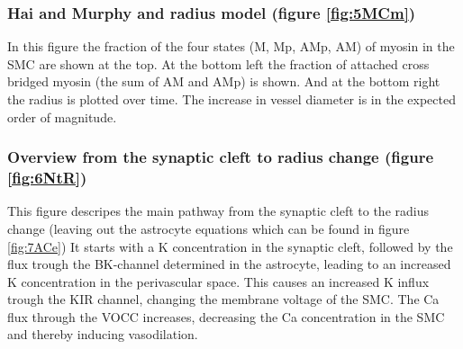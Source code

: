 	\subsubsection*{Hai and Murphy and radius model (figure \ref{fig:5MCm})}
	In this figure the fraction of the four states (M, Mp, AMp, AM) of myosin in the SMC are shown at the top. At the bottom left the fraction of attached cross bridged myosin (the sum of AM and AMp) is shown. And at the bottom right the radius is plotted over time. The increase in vessel diameter is in the expected order of magnitude.
	
	\subsubsection*{Overview from the synaptic cleft to radius change (figure \ref{fig:6NtR})}
	This figure descripes the main pathway from the synaptic cleft to the radius change (leaving out the astrocyte equations which can be found in figure \ref{fig:7ACe}) It starts with a \gls{K} concentration in the synaptic cleft, followed by the flux trough the BK-channel determined in the astrocyte, leading to an increased \gls{K} concentration in the perivascular space. This causes an increased  \gls{K} influx trough the KIR channel, changing the membrane voltage of the SMC. The \gls{Ca} flux through the VOCC increases, decreasing the \gls{Ca} concentration in the SMC and thereby inducing vasodilation. 
		
